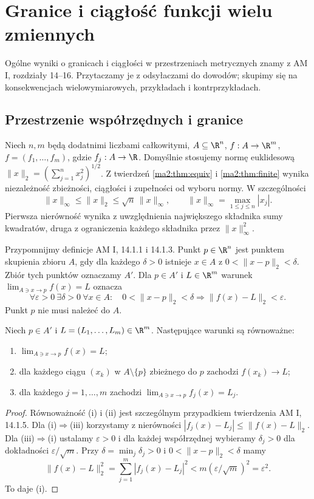 \chapter{Granice i ciągłość funkcji wielu zmiennych}
\label{ma2:ch:multivariable-continuity}

Ogólne wyniki o granicach i ciągłości w przestrzeniach
metrycznych znamy z AM I, rozdziały 14--16. Przytaczamy je
z odsyłaczami do dowodów; skupimy się na konsekwencjach
wielowymiarowych, przykładach i kontrprzykładach.

\section{Przestrzenie współrzędnych i granice}

Niech $n,m$ będą dodatnimi liczbami całkowitymi,
$A\subseteq\R^n$, $f:A\to\R^m$,
$f=(f_1,\ldots,f_m)$, gdzie $f_j:A\to\R$.
Domyślnie stosujemy normę euklidesową
$\|x\|_2=(\sum_{j=1}^n x_j^2)^{1/2}$. Z twierdzeń
\ref{ma2:thm:equiv} i \ref{ma2:thm:finite}
wynika niezależność zbieżności, ciągłości i zupełności
od wyboru normy. W szczególności
\[
 \|x\|_\infty\le\|x\|_2\le\sqrt n\,\|x\|_\infty,
 \qquad \|x\|_\infty=\max_{1\le j\le n}|x_j|.
\]
Pierwsza nierówność wynika z uwzględnienia największego
składnika sumy kwadratów, druga z ograniczenia każdego
składnika przez $\|x\|_\infty^2$.

Przypomnijmy definicje AM I, 14.1.1 i 14.1.3.
Punkt $p\in\R^n$ jest punktem skupienia zbioru $A$, gdy
dla każdego $\delta>0$ istnieje $x\in A$ z
$0<\|x-p\|_2<\delta$. Zbiór tych punktów oznaczamy $A'$.
Dla $p\in A'$ i $L\in\R^m$ warunek
$\lim_{A\ni x\to p}f(x)=L$ oznacza
\[
 \forall\varepsilon>0\ \exists\delta>0\ \forall x\in A:
 \quad 0<\|x-p\|_2<\delta\Longrightarrow
 \|f(x)-L\|_2<\varepsilon.
\]
Punkt $p$ nie musi należeć do $A$.

\begin{twierdzenie}
\label{ma2:thm:multi-limit}
Niech $p\in A'$ i $L=(L_1,\ldots,L_m)\in\R^m$.
Następujące warunki są równoważne:
\begin{enumerate}[label=(\roman*)]
 \item $\lim_{A\ni x\to p}f(x)=L$;
 \item dla każdego ciągu $(x_k)$ w $A\setminus\{p\}$
 zbieżnego do $p$ zachodzi $f(x_k)\to L$;
 \item dla każdego $j=1,\ldots,m$ zachodzi
 $\lim_{A\ni x\to p}f_j(x)=L_j$.
\end{enumerate}
\end{twierdzenie}
\begin{proof}
Równoważność (i) i (ii) jest szczególnym przypadkiem
twierdzenia AM I, 14.1.5.
Dla (i)$\Rightarrow$(iii) korzystamy z nierówności
$|f_j(x)-L_j|\le\|f(x)-L\|_2$.
Dla (iii)$\Rightarrow$(i) ustalamy $\varepsilon>0$ i
dla każdej współrzędnej wybieramy $\delta_j>0$ dla
dokładności $\varepsilon/\sqrt m$.
Przy $\delta=\min_j\delta_j>0$ i
$0<\|x-p\|_2<\delta$ mamy
\[
 \|f(x)-L\|_2^2=\sum_{j=1}^m|f_j(x)-L_j|^2
 < m(\varepsilon/\sqrt m)^2=\varepsilon^2.
\]
To daje (i).
\end{proof}

